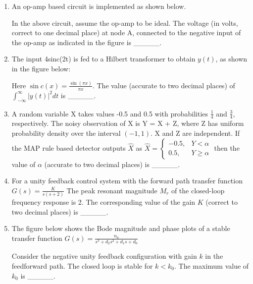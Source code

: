 \documentclass{article}
\begin{document}
\begin{enumerate}
\item An op-amp based circuit is implemented as shown below.
\begin{figure}[H]
    \centering
    
    \caption{}
    \label{fig:q48}
\end{figure}
In the above circuit, assume the op-amp to be ideal. The voltage (in volts, correct to one decimal place) at node A, connected to the negative input of the op-amp as indicated in the figure is \_\_\_\_\_.

\item The input 4sinc(2t) is fed to a Hilbert transformer to obtain $y(t)$, as shown in the figure below:
\begin{figure}[H]
    \centering
    
    \caption{}
    \label{fig:q49}
\end{figure}
Here $\sin c(x) = \frac{\sin(\pi x)}{\pi x}$. The value (accurate to two decimal places) of $\int_{-\infty}^{\infty} |y(t)|^2 dt$ is \_\_\_\_\_.

\item A random variable X takes values -0.5 and 0.5 with probabilities $\frac{1}{4}$ and $\frac{3}{4}$, respectively. The noisy observation of X is Y = X + Z, where Z has uniform probability density over the interval $(-1, 1)$. X and Z are independent. If the MAP rule based detector outputs $\hat{X}$ as
$\hat{X} = \begin{cases} -0.5, & Y < \alpha \\ 0.5, & Y \geq \alpha \end{cases}$
then the value of $\alpha$ (accurate to two decimal places) is \_\_\_\_\_.

\item For a unity feedback control system with the forward path transfer function
$G(s) = \frac{K}{s(s+2)}$
The peak resonant magnitude $M_r$ of the closed-loop frequency response is 2. The corresponding value of the gain $K$ (correct to two decimal places) is \_\_\_\_\_.

\item The figure below shows the Bode magnitude and phase plots of a stable transfer function
$G(s) = \frac{n_0}{s^3 + d_2 s^2 + d_1 s + d_0}$
\begin{figure}[H]
    \centering
    
    \caption{}
    \label{fig:q52a}
\end{figure}

\begin{figure}[H]
    \centering
    
    \caption{}
    \label{fig:q52b}
\end{figure}
Consider the negative unity feedback configuration with gain $k$ in the feedforward path. The closed loop is stable for $k < k_0$. The maximum value of $k_0$ is \_\_\_\_\_.


\end{enumerate}
\end{document}
